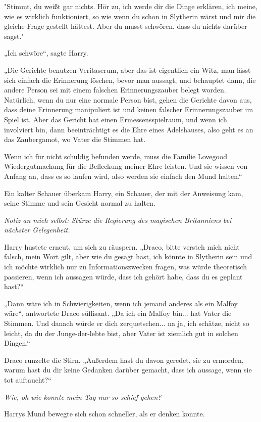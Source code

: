 {"Stimmt, du weißt gar nichts. Hör zu, ich werde dir die Dinge erklären, ich meine, wie es wirklich funktioniert, so wie wenn du schon in Slytherin wärst und mir die gleiche Frage gestellt hättest. Aber du musst schwören, dass du nichts darüber sagst."

„Ich schwöre“, sagte Harry.

„Die Gerichte benutzen Veritaserum, aber das ist eigentlich ein Witz, man lässt sich einfach die Erinnerung löschen, bevor man aussagt, und behauptet dann, die andere Person sei mit einem falschen Erinnerungszauber belegt worden. Natürlich, wenn du nur eine normale Person bist, gehen die Gerichte davon aus, dass deine Erinnerung manipuliert ist und keinen falscher Erinnerungszauber im Spiel ist. Aber das Gericht hat einen Ermessensspielraum, und wenn ich involviert bin, dann beeinträchtigt es die Ehre eines Adelshauses, also geht es an das Zaubergamot, wo Vater die Stimmen hat.

Wenn ich für nicht schuldig befunden werde, muss die Familie Lovegood Wiedergutmachung für die Befleckung meiner Ehre leisten. Und sie wissen von Anfang an, dass es so laufen wird, also werden sie einfach den Mund halten.“

Ein kalter Schauer überkam Harry, ein Schauer, der mit der Anweisung kam, seine Stimme und sein Gesicht normal zu halten.

\emph{Notiz an mich selbst: Stürze die Regierung des magischen Britanniens bei nächster Gelegenheit.}

Harry hustete erneut, um sich zu räuspern. „Draco, bitte versteh mich nicht falsch, mein Wort gilt, aber wie du gesagt hast, ich könnte in Slytherin sein und ich möchte wirklich nur zu Informationszwecken fragen, was würde theoretisch passieren, wenn ich aussagen würde, dass ich gehört habe, dass du es geplant hast?“

„Dann wäre ich in Schwierigkeiten, wenn ich jemand anderes als ein Malfoy wäre“, antwortete Draco süffisant. „Da ich ein Malfoy bin... hat Vater die Stimmen. Und danach würde er dich zerquetschen... na ja, ich schätze, nicht so leicht, da du der Junge-der-lebte bist, aber Vater ist ziemlich gut in solchen Dingen.“

Draco runzelte die Stirn. „Außerdem hast du davon geredet, sie zu ermorden, warum hast du dir keine Gedanken darüber gemacht, dass ich aussage, wenn sie tot auftaucht?“

\emph{Wie, oh wie konnte mein Tag nur so schief gehen?}

Harrys Mund bewegte sich schon schneller, als er denken konnte.

}
